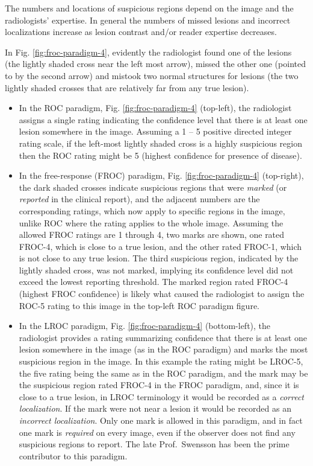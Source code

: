 \documentclass[
]{book}
\begin{document}
The numbers and locations of suspicious regions depend on the image and the radiologists' expertise. In general the numbers of missed lesions and incorrect localizations increase as lesion contrast and/or reader expertise decreases.

In Fig. \ref{fig:froc-paradigm-4}, evidently the radiologist found one of the lesions (the lightly shaded cross near the left most arrow), missed the other one (pointed to by the second arrow) and mistook two normal structures for lesions (the two lightly shaded crosses that are relatively far from any true lesion).

\begin{itemize}
\item
  In the ROC paradigm, Fig. \ref{fig:froc-paradigm-4} (top-left), the radiologist assigns a single rating indicating the confidence level that there is at least one lesion somewhere in the image. Assuming a 1 -- 5 positive directed integer rating scale, if the left-most lightly shaded cross is a highly suspicious region then the ROC rating might be 5 (highest confidence for presence of disease).
\item
  In the free-response (FROC) paradigm, Fig. \ref{fig:froc-paradigm-4} (top-right), the dark shaded crosses indicate suspicious regions that were \emph{marked} (or \emph{reported} in the clinical report), and the adjacent numbers are the corresponding ratings, which now apply to specific regions in the image, unlike ROC where the rating applies to the whole image. Assuming the allowed FROC ratings are 1 through 4, two marks are shown, one rated FROC-4, which is close to a true lesion, and the other rated FROC-1, which is not close to any true lesion. The third suspicious region, indicated by the lightly shaded cross, was not marked, implying its confidence level did not exceed the lowest reporting threshold. The marked region rated FROC-4 (highest FROC confidence) is likely what caused the radiologist to assign the ROC-5 rating to this image in the top-left ROC paradigm figure.
\item
  In the LROC paradigm, Fig. \ref{fig:froc-paradigm-4} (bottom-left), the radiologist provides a rating summarizing confidence that there is at least one lesion somewhere in the image (as in the ROC paradigm) and marks the most suspicious region in the image. In this example the rating might be LROC-5, the five rating being the same as in the ROC paradigm, and the mark may be the suspicious region rated FROC-4 in the FROC paradigm, and, since it is close to a true lesion, in LROC terminology it would be recorded as a \emph{correct localization}. If the mark were not near a lesion it would be recorded as an \emph{incorrect localization}. Only one mark is allowed in this paradigm, and in fact one mark is \emph{required} on every image, even if the observer does not find any suspicious regions to report. The late Prof.~Swensson has been the prime contributor to this paradigm.

\end{itemize}
\end{document}
